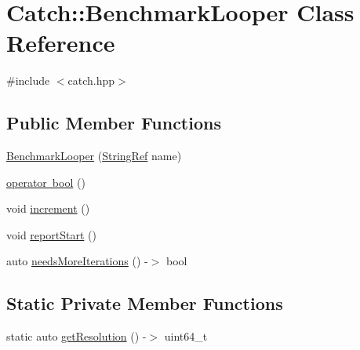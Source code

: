 \hypertarget{class_catch_1_1_benchmark_looper}{}\section{Catch\+::Benchmark\+Looper Class Reference}
\label{class_catch_1_1_benchmark_looper}


{\ttfamily \#include $<$catch.\+hpp$>$}

\subsection*{Public Member Functions}
\begin{DoxyCompactItemize}
\item 
\mbox{\hyperlink{class_catch_1_1_benchmark_looper_ab9ba6397306a70082f39e63a8a71bde6}{Benchmark\+Looper}} (\mbox{\hyperlink{class_catch_1_1_string_ref}{String\+Ref}} name)
\item 
\mbox{\hyperlink{class_catch_1_1_benchmark_looper_a54da41bada9da038dc05faf41d746765}{operator bool}} ()
\item 
void \mbox{\hyperlink{class_catch_1_1_benchmark_looper_a210552aff5b19408637444d4bb35d59c}{increment}} ()
\item 
void \mbox{\hyperlink{class_catch_1_1_benchmark_looper_a0697d1b266112b110edf2025b82c4e77}{report\+Start}} ()
\item 
auto \mbox{\hyperlink{class_catch_1_1_benchmark_looper_a97bd944521f519b1593a5d1d2f9998fa}{needs\+More\+Iterations}} () -\/$>$ bool
\end{DoxyCompactItemize}
\subsection*{Static Private Member Functions}
\begin{DoxyCompactItemize}
\item 
static auto \mbox{\hyperlink{class_catch_1_1_benchmark_looper_a45fd79f05ac1fb21dcfb3a81cf052705}{get\+Resolution}} () -\/$>$ uint64\+\_\+t
\end{DoxyCompactItemize}
